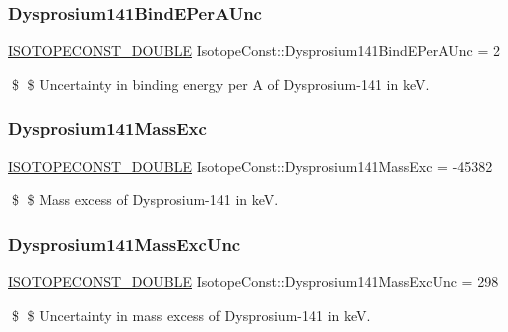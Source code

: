 \subsubsection{\texorpdfstring{Dysprosium141\+Bind\+E\+Per\+A\+Unc}{Dysprosium141BindEPerAUnc}}
{\footnotesize\ttfamily \mbox{\hyperlink{group___isotope_const-_macros_ga8f45a7272ce02c0b4c65c44636ed719a}{I\+S\+O\+T\+O\+P\+E\+C\+O\+N\+S\+T\+\_\+\+D\+O\+U\+B\+LE}} Isotope\+Const\+::\+Dysprosium141\+Bind\+E\+Per\+A\+Unc = 2}

\$ \$ Uncertainty in binding energy per A of Dysprosium-\/141 in keV. \mbox{\label{group___isotope_const-_dysprosium-_dy141_gabbb790b8cdcc8e5ba18a5afae944e011}} 
\subsubsection{\texorpdfstring{Dysprosium141\+Mass\+Exc}{Dysprosium141MassExc}}
{\footnotesize\ttfamily \mbox{\hyperlink{group___isotope_const-_macros_ga8f45a7272ce02c0b4c65c44636ed719a}{I\+S\+O\+T\+O\+P\+E\+C\+O\+N\+S\+T\+\_\+\+D\+O\+U\+B\+LE}} Isotope\+Const\+::\+Dysprosium141\+Mass\+Exc = -\/45382}

\$ \$ Mass excess of Dysprosium-\/141 in keV. \mbox{\label{group___isotope_const-_dysprosium-_dy141_gad6f96746aec7c89cee88a369875ca96e}} 
\subsubsection{\texorpdfstring{Dysprosium141\+Mass\+Exc\+Unc}{Dysprosium141MassExcUnc}}
{\footnotesize\ttfamily \mbox{\hyperlink{group___isotope_const-_macros_ga8f45a7272ce02c0b4c65c44636ed719a}{I\+S\+O\+T\+O\+P\+E\+C\+O\+N\+S\+T\+\_\+\+D\+O\+U\+B\+LE}} Isotope\+Const\+::\+Dysprosium141\+Mass\+Exc\+Unc = 298}

\$ \$ Uncertainty in mass excess of Dysprosium-\/141 in keV. \mbox{\label{group___isotope_const-_dysprosium-_dy141_gaa37d333a9fad13c227671a064f05a0f7}} 
